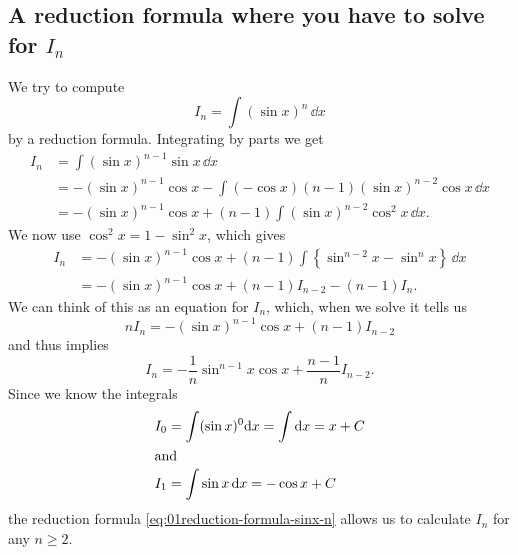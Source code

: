 \subsection{A reduction formula where you have to solve for $I_n$} %
\label{sec:01sin-n-x-reduction-formula}
We try to compute
\[
I_n = \int (\sin x)^n\,\dd x
\]
by a reduction formula. Integrating by parts we get
\begin{align*}
  I_n
  &= \int (\sin x)^{n-1}\sin x\,\dd x \\
  &= - (\sin x)^{n-1}\cos x
  -\int (-\cos x) (n-1) (\sin x)^{n-2}\cos x\,\dd x \\
  &= - (\sin x)^{n-1}\cos x +(n-1)\int (\sin x)^{n-2} \cos^2x\,\dd x.
\end{align*}
We now use $\cos^2x=1-\sin^2x$, which gives
\begin{align*}
  I_n &= - (\sin x)^{n-1}\cos x
  +(n-1)\int\left\{\sin^{n-2}x-\sin^n x\right\}\,\dd x \\
  &= - (\sin x)^{n-1}\cos x + (n-1)I_{n-2}- (n-1)I_n.
\end{align*}
We can think of this as an equation for $I_n$, which, when we solve it tells us
\[
nI_n = - (\sin x)^{n-1}\cos x + (n-1)I_{n-2}
\]
and thus implies
\begin{equation}
  I_n = -\frac1n \sin^{n-1}x\cos x + \frac{n-1}n I_{n-2}.
  \label{eq:01reduction-formula-sinx-n}
\end{equation}
Since we know the integrals
\begin{align*}
  I_0&= \int (\sin x)^0\mathrm{d} x = \int\mathrm{d} x = x+C\\
  \intertext{and} I_1&= \int \sin x\,\mathrm{d} x = -\cos x+C
\end{align*}
the reduction formula \eqref{eq:01reduction-formula-sinx-n} allows us to
calculate $I_n$ for any $n\geq2$.


